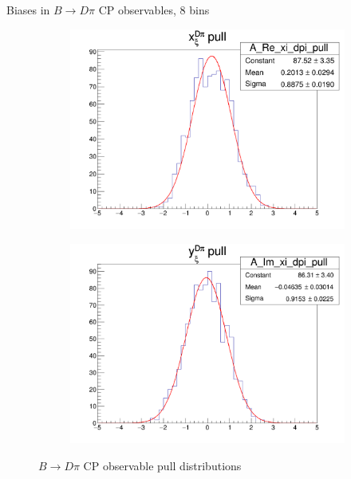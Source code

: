 \documentclass{beamer}
\begin{document}
\begin{frame}{Biases in $B\to D\pi$ CP observables, $8$ bins}
  \begin{figure}
    \centering
    \vspace{-0.2cm}
    \begin{subfigure}{0.5\textwidth}
      \includegraphics[width = 1.0\textwidth]{A_Re_xi_dpi_8Bins_pull.png}
    \end{subfigure}%
    \begin{subfigure}{0.5\textwidth}
      \includegraphics[width = 1.0\textwidth]{A_Im_xi_dpi_8Bins_pull.png}
    \end{subfigure}
    \caption{$B\to D\pi$ CP observable pull distributions}
  \end{figure}
\end{frame}
\end{document}
